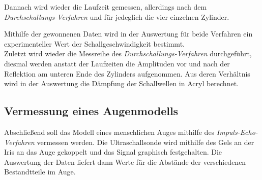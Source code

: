 Dannach wird wieder die Laufzeit gemessen, allerdings nach dem \textit{Durchschallungs-Verfahren} und für jedeglich die
vier einzelnen Zylinder.

Mithilfe der gewonnenen Daten wird in der Auswertung für beide Verfahren ein experimenteller Wert der Schallgeschwindigkeit bestimmt. \\

Zuletzt wird wieder die Messreihe des \textit{Durchschallungs-Verfahren} durchgeführt, diesmal werden anstatt der Laufzeiten die
Amplituden vor und nach der Reflektion am unteren Ende des Zylinders aufgenommen.
Aus deren Verhältnis wird in der Auswertung die Dämpfung der Schallwellen in Acryl berechnet.

\subsection{Vermessung eines Augenmodells}

Abschließend soll das Modell eines menschlichen Auges mithilfe des \textit{Impuls-Echo-Verfahren} vermessen werden.
Die Ultraschallsonde wird mithilfe des Gels an der Iris an das Auge gekoppelt und das Signal graphisch festgehalten.
Die Auswertung der Daten liefert dann Werte für die Abstände der verschiedenen Bestandtteile im Auge.